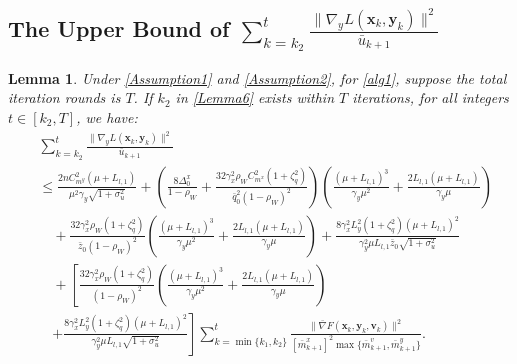 \documentclass{article}
\theoremstyle{plain}
\newtheorem{lemma}[lemma]{Lemma}
\theoremstyle{definition}
\theoremstyle{remark}
\begin{document}
\subsection{The Upper Bound of $\sum_{k=k_2}^t \frac{ \|\nabla_y L(\mathbf{x}_k, \mathbf{y}_k)\|^2}{\bar{u}_{k+1}}$}
\begin{lemma}\label{Lemma7} Under \cref{Assumption1} and \cref{Assumption2}, for \cref{alg1}, suppose the total iteration rounds is \(T\). If \(k_2\) in \cref{Lemma6} exists within \(T\) iterations, for all integers \(t \in [k_2, T]\), we have:
\begin{align}
    &\sum_{k=k_2}^t \frac{ \|\nabla_y L(\mathbf{x}_k, \mathbf{y}_k)\|^2}{\bar{u}_{k+1}}\nonumber\\
    &\leq\frac{ 2nC_{m^y}^2(\mu + L_{l,1})}{\mu^2\gamma_y\sqrt{1+\sigma_u^2}} +\left(\frac{8\Delta_0^x}{1-\rho_W}+\frac{32 \gamma_x^2 \rho_WC_{m^x}^2 (1 + \zeta_q^2)}{\bar{q}_0^2(1 - \rho_W)^2} \right)\left(\frac{(\mu+L_{l,1})^3}{\gamma_y\mu^2}+\frac{2L_{l,1}(\mu+L_{l,1})}{\gamma_y\mu}\right)\nonumber\\
&\quad+ \frac{32 \gamma_x^2 \rho_W(1 + \zeta_q^2)}{\bar{z}_0(1 - \rho_W)^2} \left(\frac{(\mu+L_{l,1})^3}{\gamma_y\mu^2}+\frac{2L_{l,1}(\mu+L_{l,1})}{\gamma_y\mu}\right)+\frac{8\gamma_x^2  L_y^2\left( 1 + \zeta_q^2 \right) (\mu + L_{l,1})^2}{\gamma_y^2\mu L_{l,1}\bar{z}_0\sqrt{1+\sigma_u^2}} \nonumber\\
&\quad+ \left[\frac{32 \gamma_x^2 \rho_W(1 + \zeta_q^2)}{(1 - \rho_W)^2} \left(\frac{(\mu+L_{l,1})^3}{\gamma_y\mu^2}+\frac{2L_{l,1}(\mu+L_{l,1})}{\gamma_y\mu}\right)\right.\nonumber\\
&\quad\left.+\frac{8\gamma_x^2  L_y^2\left( 1 + \zeta_q^2 \right) (\mu + L_{l,1})^2}{\gamma_y^2\mu L_{l,1}\sqrt{1+\sigma_u^2}}\right]\!\! \sum_{k=\min\{k_1,k_2\}}^t \frac{\|\bar{\nabla} F(\mathbf{x}_k,\mathbf{y}_k,\mathbf{v}_k)\|^2}{[\bar{m}^x_{k+1}]^2\max \big\{\bar{m}^v_{k+1}, \bar{m}^y_{k+1}\big\}}.\label{eq58}
\end{align}
\end{lemma}
\end{document}
